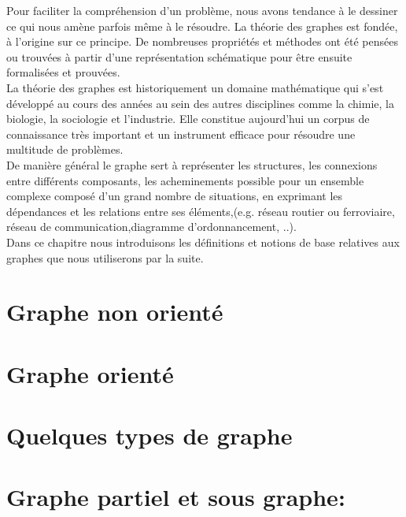 Pour faciliter la compréhension d’un problème, nous avons tendance à  le dessiner ce qui nous amène parfois même à le résoudre. La théorie des graphes est fondée, à l’origine sur ce principe. De nombreuses propriétés et méthodes ont été pensées ou trouvées à partir d’une représentation schématique pour être ensuite formalisées et prouvées.\\
La théorie des graphes est historiquement un domaine mathématique qui s’est développé au cours des années au sein des autres disciplines comme la chimie, la biologie, la sociologie et l'industrie. Elle constitue aujourd'hui un corpus de connaissance très important et un instrument efficace pour résoudre une multitude de problèmes.\\	
De manière général le graphe sert à représenter les structures, les connexions entre différents composants, les acheminements possible pour un ensemble complexe composé d'un grand nombre de situations, en exprimant les dépendances et les relations entre ses éléments,(e.g. réseau routier ou ferroviaire, réseau de communication,diagramme d'ordonnancement, ..). \\
Dans ce chapitre nous introduisons les définitions et notions de base relatives aux graphes que nous utiliserons par la suite.
	
	
	\section{Graphe non orienté}
		
			
	\section{Graphe orienté}	
		
	
	\section{Quelques types de graphe}
			
	
	\section{Graphe partiel et sous graphe:}
    			
    		
